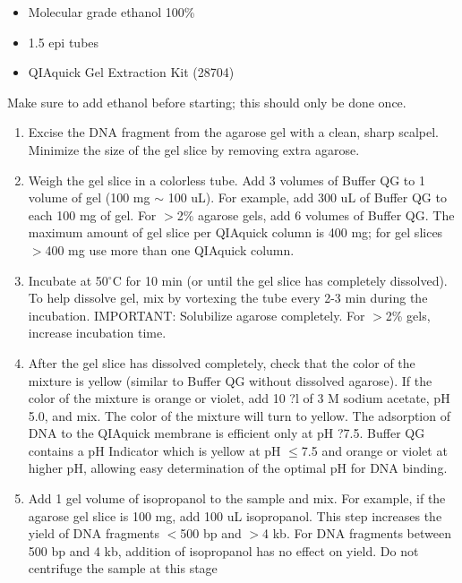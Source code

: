 \documentclass[11pt, oneside]{article}
\begin{document}
		
			\begin{itemize}
				\itemsep0mm
				\item Molecular grade ethanol 100\%
				\item 1.5 epi tubes
				\item QIAquick Gel Extraction Kit (28704)
			\end{itemize}
		
		
			Make sure to add ethanol before starting; this should only be done once. 
		
		\vspace{3mm}
		
			\begin{enumerate}
			 	\item Excise the DNA fragment from the agarose gel with a clean, sharp scalpel. Minimize the size of the gel slice by removing extra 				agarose.
				\item Weigh the gel slice in a colorless tube. Add 3 volumes of Buffer QG to 1 volume of gel (100 mg $\sim$ 100 uL). For example, add 				300 uL of Buffer QG to each 100 mg of gel. For $>$2\% agarose gels, add 6 volumes of Buffer QG. The maximum amount of gel slice 				per QIAquick column is 400 mg; for gel slices $>$400 mg use more than one QIAquick column.
				\item Incubate at 50$^{\circ}$C for 10 min (or until the gel slice has completely dissolved). To help dissolve gel, mix by vortexing the tube 				every 2-3 min during the incubation. IMPORTANT: Solubilize agarose completely. For $>$2\% gels, increase incubation time.
				\item After the gel slice has dissolved completely, check that the color of the mixture is yellow (similar to Buffer QG without dissolved 				agarose). If the color of the mixture is orange or violet, add 10 ?l of 3 M sodium acetate, pH 5.0, and mix. The color of the mixture will 				turn to yellow. The adsorption of DNA to the QIAquick membrane is efficient only at pH ?7.5. Buffer QG contains a pH Indicator which is 				yellow at pH $\leq$7.5 and orange or violet at higher pH, allowing easy determination of the optimal pH for DNA binding.
				\item Add 1 gel volume of isopropanol to the sample and mix. For example, if the agarose gel slice is 100 mg, add 100 uL isopropanol. 				This step increases the yield of DNA fragments $<$500 bp and $>$4 kb. For DNA fragments between 500 bp and 4 kb, addition of 					isopropanol has no effect on yield. Do not centrifuge the sample at this stage

\end{enumerate}
\end{document}
